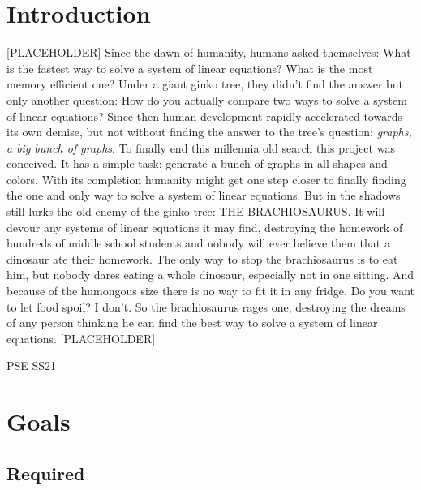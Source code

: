 \section{Introduction}

[PLACEHOLDER] Since the dawn of humanity, humans asked themselves: What is the fastest way to solve a system of linear equations? What is the most memory efficient one? Under a giant ginko tree, they didn't find the answer but only another question: How do you actually compare two ways to solve a system of linear equations? Since then human development rapidly accelerated towards its own demise, but not without finding the answer to the tree's question: \emph{graphs, a big bunch of graphs}. To finally end this millennia old search this project was conceived. It has a simple task: generate a bunch of graphs in all shapes and colors. With its completion humanity might get one step closer to finally finding the one and only way to solve a system of linear equations. But in the shadows still lurks the old enemy of the ginko tree: THE BRACHIOSAURUS. It will devour any systems of linear equations it may find, destroying the homework of hundreds of middle school students and nobody will ever believe them that a dinosaur ate their homework. The only way to stop the brachiosaurus is to eat him, but nobody dares eating a whole dinosaur, especially not in one sitting. And because of the humongous size there is no way to fit it in any fridge. Do you want to let food spoil? I don't. So the brachiosaurus rages one, destroying the dreams of any person thinking he can find the best way to solve a system of linear equations. [PLACEHOLDER]

PSE SS21

\section{Goals}

\subsection{Required}


